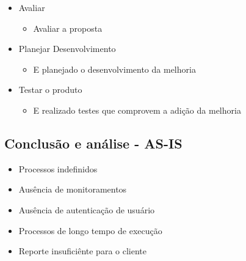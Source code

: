 \begin{itemize}[noitemsep]
	\item Avaliar
		\begin{itemize}
			\item Avaliar a proposta
		\end{itemize}
	\item Planejar Desenvolvimento
		\begin{itemize}
			\item E planejado o desenvolvimento da melhoria
		\end{itemize}
	\item Testar o produto
			\begin{itemize}
				\item E realizado testes que comprovem a adição da melhoria
			\end{itemize}
\end{itemize}


\subsection{Conclusão e análise - AS-IS}
\begin{itemize}[noitemsep]
  \item Processos indefinidos
  \item Ausência de monitoramentos
  \item Ausência de autenticação de usuário
  \item Processos de longo tempo de execução
  \item Reporte insuficiênte para o cliente
\end{itemize}

